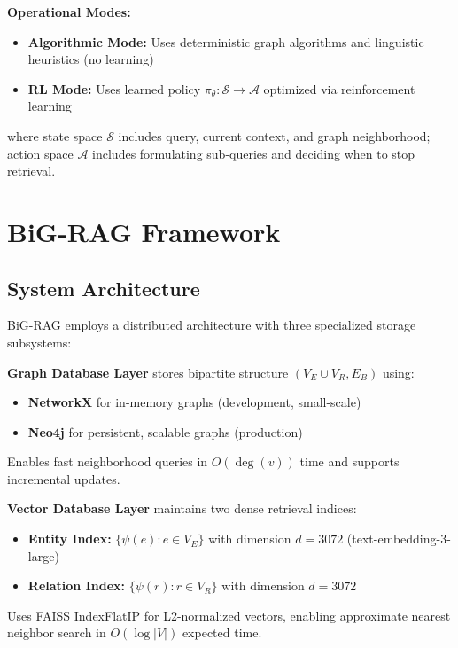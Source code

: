 \documentclass[11pt,a4paper]{article}
\begin{document}
\textbf{Operational Modes:}

\begin{itemize}
    \item \textbf{Algorithmic Mode:} Uses deterministic graph algorithms and linguistic heuristics (no learning)
    \item \textbf{RL Mode:} Uses learned policy $\pi_\theta: \mathcal{S} \rightarrow \mathcal{A}$ optimized via reinforcement learning
\end{itemize}

where state space $\mathcal{S}$ includes query, current context, and graph neighborhood; action space $\mathcal{A}$ includes formulating sub-queries and deciding when to stop retrieval.

\section{BiG-RAG Framework}

\subsection{System Architecture}

BiG-RAG employs a distributed architecture with three specialized storage subsystems:

\textbf{Graph Database Layer} stores bipartite structure $(V_E \cup V_R, E_B)$ using:
\begin{itemize}
    \item \textbf{NetworkX} for in-memory graphs (development, small-scale)
    \item \textbf{Neo4j} for persistent, scalable graphs (production)
\end{itemize}

Enables fast neighborhood queries in $O(\deg(v))$ time and supports incremental updates.

\textbf{Vector Database Layer} maintains two dense retrieval indices:
\begin{itemize}
    \item \textbf{Entity Index:} $\{\psi(e) : e \in V_E\}$ with dimension $d=3072$ (text-embedding-3-large)
    \item \textbf{Relation Index:} $\{\psi(r) : r \in V_R\}$ with dimension $d=3072$
\end{itemize}

Uses FAISS IndexFlatIP for L2-normalized vectors, enabling approximate nearest neighbor search in $O(\log |V|)$ expected time.
\end{document}
